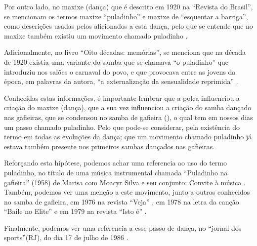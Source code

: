 Por outro lado, no maxixe (dança)  que é descrito em 1920 na ``Revista do Brasil'',
se mencionam os termos maxixe ``puladinho'' e maxixe de ``esquentar a barriga'',
como descrições usadas pelos aficionados a esta dança, 
pelo que se entende que no maxixe também existiu um movimento chamado puladinho \cite[pp. 177]{1920revista}. 

Adicionalmente, no livro ``Oito décadas: memórias'', se menciona que na década de
1920 existia uma variante do samba que se chamava ``o puladinho'' 
que introduziu nos salões o carnaval do povo, 
e que provocava entre as jovens da época, em palavras da autora, 
``a externalização da sensualidade reprimida'' \cite[pp. 94-95]{nabuco2000oito}.

Conhecidas estas informações, é importante lembrar que a polca influenciou a criação do maxixe (dança), 
que a sua vez influenciou a criação do samba dançado nas gafieiras,
que se condensou no samba de gafieira (\AnoLivro), o qual tem em nossos dias um passo chamado puladinho. 
Pelo que pode-se considerar, pela existência do termo em todas as evoluções da dança; 
que um movimento chamado puladinho 
já estava também presente nos primeiros sambas dançados nas gafieiras. 

Reforçando esta hipótese, podemos achar uma referencia ao uso do termo puladinho, no título de uma música instrumental chamada 
``Puladinho na gafieira'' (1958)  de  Marisa com Moacyr Silva e seu conjunto: Convite à música \cite{puladinhogafieiramusic}.
Também, podemos ver uma menção a este movimento, junto a outros conhecidos no samba de gafieira,
em 1976 na revista ``Veja'' \cite[pp. 158]{1976veja},
em 1978 na letra da canção ``Baile no Elite'' \cite{BaileNoElite} e 
em 1979 na revista ``Isto é'' \cite[pp. 89]{revista1979isto}.



Finalmente, podemos ver uma referencia a esse passo de dança, no ``jornal dos sports''(RJ),
do dia 17 de julho de 1986 \cite[pp. 6]{gafieiraaredeout2}.


